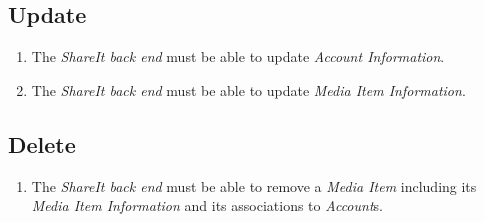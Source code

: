\documentclass[../report.tex]{subfiles}
\begin{document}
\subsection{Update}
\begin{enumerate}[label=FR-\twodigits*,resume]

\item The \textit{ShareIt back end} must be able to update \textit{Account Information}. 

\item The \textit{ShareIt back end} must be able to update \textit{Media Item Information}.

\end{enumerate}
\subsection{Delete}
\begin{enumerate}[label=FR-\twodigits*,resume]

\item The \textit{ShareIt back end} must be able to remove a \textit{Media Item} including its \textit{Media Item Information} and its associations to \textit{Account}s.

\end{enumerate}

 
\end{document}
